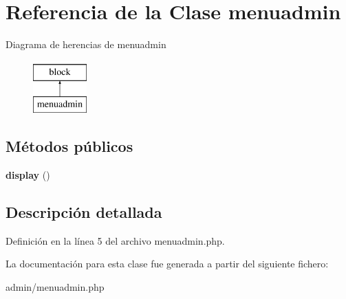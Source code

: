 \hypertarget{classmenuadmin}{\section{\-Referencia de la \-Clase menuadmin}
\label{classmenuadmin}
}
\-Diagrama de herencias de menuadmin\begin{figure}[H]
\begin{center}
\leavevmode
\includegraphics[height=2.000000cm]{classmenuadmin}
\end{center}
\end{figure}
\subsection*{\-Métodos públicos}
\begin{DoxyCompactItemize}
\item 
\hypertarget{classmenuadmin_a2df0d677d2ebbb3586176372ccd4b009}{{\bfseries display} ()}\label{classmenuadmin_a2df0d677d2ebbb3586176372ccd4b009}

\end{DoxyCompactItemize}


\subsection{\-Descripción detallada}


\-Definición en la línea 5 del archivo menuadmin.\-php.



\-La documentación para esta clase fue generada a partir del siguiente fichero\-:\begin{DoxyCompactItemize}
\item 
admin/menuadmin.\-php\end{DoxyCompactItemize}
